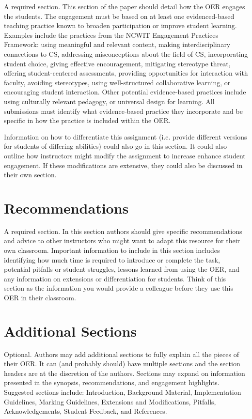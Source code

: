 \documentclass[acmengage]{acmart}
\begin{document}
A required section. This section of the paper should detail how the OER engages the students. The engagement must be based on at least one evidenced-based teaching practice known to broaden participation or improve student learning. Examples include the practices from the NCWIT Engagement Practices Framework: using meaningful and relevant content, making interdisciplinary connections to CS, addressing misconceptions about the field of CS, incorporating student choice, giving effective encouragement, mitigating stereotype threat, offering student-centered assessments, providing opportunities for interaction with faculty, avoiding stereotypes, using well-structured collaborative learning, or encouraging student interaction. Other potential evidence-based practices include using culturally relevant pedagogy, or universal design for learning. All submissions must identify what evidence-based practice they incorporate and be specific in how the practice is included within the OER.

Information on how to differentiate this assignment (i.e. provide different versions for students of differing abilities) could also go in this section. It could also outline how instructors might modify
the assignment to increase enhance student engagement. If these modifications are extensive, they could also be discussed in their own section.

\section{Recommendations}

A required section. In this section authors should give specific recommendations and advice to other instructors who might want to adapt this resource for their own classroom. Important information to include in this section includes identifying how much time is required to introduce or complete the task, potential pitfalls or student struggles, lessons learned from using the OER, and any information on extensions or differentiation for students. Think of this section as the information you would provide a colleague before they use this OER in their classroom.

\section{Additional Sections}

Optional. Authors may add additional sections to fully explain all the pieces of their OER. It can (and probably should) have multiple sections and the section headers are at the discretion of the authors. Sections may expand on information presented in the synopsis, recommendations, and engagement highlights. Suggested sections include: Introduction, Background Material, Implementation Guidelines, Marking Guidelines, Extensions and Modifications, Pitfalls, Acknowledgements, Student Feedback, and References.
\end{document}
